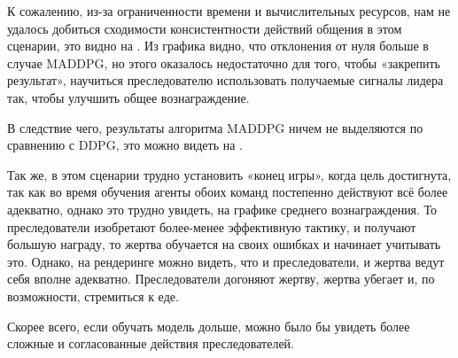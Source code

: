 К сожалению, из-за ограниченности времени и вычислительных ресурсов, нам не удалось добиться сходимости консистентности действий общения в этом сценарии, это видно на . Из графика видно, что отклонения от нуля больше в случае MADDPG, но этого оказалось недостаточно для того, чтобы «закрепить результат», научиться преследователю использовать получаемые сигналы лидера так, чтобы улучшить общее вознаграждение.

В следствие чего, результаты алгоритма MADDPG ничем не выделяются по сравнению с DDPG, это можно видеть на .

Так же, в этом сценарии трудно установить «конец игры», когда цель достигнута, так как во время обучения агенты обоих команд постепенно действуют всё более адекватно, однако это трудно увидеть, на графике среднего вознаграждения. То преследователи изобретают более-менее эффективную тактику, и получают большую награду, то жертва обучается на своих ошибках и начинает учитывать это. Однако, на рендеринге можно видеть, что и преследователи, и жертва ведут себя вполне адекватно. Преследователи догоняют жертву, жертва убегает и, по возможности, стремиться к еде.

Скорее всего, если обучать модель дольше, можно было бы увидеть более сложные и согласованные действия преследователей.
